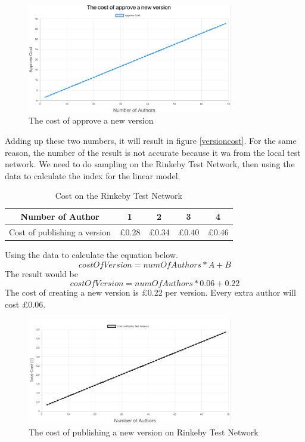 \documentclass[openany,12pt]{ecsthesis}      %
\begin{document}
\begin{figure}[H]
  \centering
  \includegraphics[width=0.8\textwidth]{fxxk.png}
  \caption{The cost of approve a new version}
  \label{fxxk1}
\end{figure}
Adding up these two numbers, it will result in figure \ref{versioncost}.
For the same reason, the number of the result is not accurate because it wa from the local test network.
We need to do sampling on the Rinkeby Test Network, then using the data to calculate the index for the linear model.
\begin{table}[H] 
  \centering
  \caption{Cost on the Rinkeby Test Network}
\begin{tabular}{|c|c|c|c|c|}
  \hline Number of Author & 1 & 2&3&4  \\
  \hline Cost of publishing a version &£0.28&£0.34&£0.40&£0.46\\
  \hline
 \end{tabular}
\end{table}
Using the data to calculate the equation below.
\begin{equation}
  costOfVersion = numOfAuthors * A + B
\end{equation}
The result would be
\begin{equation}
  costOfVersion = numOfAuthors * 0.06 + 0.22
\end{equation}
The cost of creating a new version is £0.22 per version. Every extra author will cost £0.06.
\begin{figure}[H]
  \centering
  \includegraphics[width=0.8\textwidth]{rversioncost.png}
  \caption{The cost of publishing a new version on Rinkeby Test Network}
  \label{fxxk1}
\end{figure}
\end{document}
